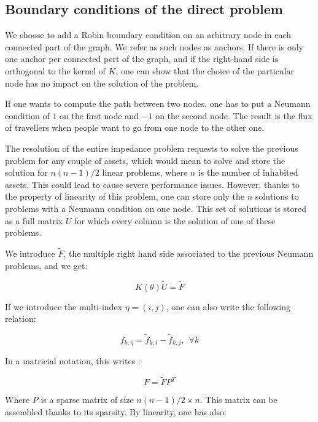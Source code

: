 \documentclass[11pt,a4paper]{article}		%
\begin{document}
\subsection{Boundary conditions of the direct problem}

We choose to add a Robin boundary condition on an arbitrary node in each connected part of the graph. We refer as such nodes as anchors. If there is only one anchor per connected pert of the graph, and if the right-hand side is orthogonal to the kernel of $K$, one can show that the choice of the particular node has no impact on the solution of the problem.

If one wants to compute the path between two nodes, one has to put a Neumann condition of $1$ on the first node and $-1$ on the second node. The result is the flux of travellers when people want to go from one node to the other one.

The resolution of the entire impedance problem requests to solve the previous problem for any couple of assets, which would mean to solve and store the solution for $n(n-1)/2$ linear problems, where $n$ is the number of inhabited assets. This could lead to cause severe performance issues. However, thanks to the property of linearity of this problem, one can store only the $n$ solutions to problems with a Neumann condition on one node. This set of solutions is stored as a full matrix $\tilde{U}$ for which every column is the solution of one of these problems.

We introduce $\tilde{F}$, the multiple right hand side associated to the previous Neumann problems, and we get:

\begin{equation}
K(\theta)\tilde{U} = \tilde{F}
\end{equation}

If we introduce the multi-index $\eta = (i,j)$, one can also write the following relation:

\begin{equation}
f_{k,\eta} = \tilde{f}_{k,i} - \tilde{f}_{k,j},\ \ \forall k
\end{equation}

In a matricial notation, this writes :

\begin{equation}
F = \tilde{F} P^T
\end{equation}

Where $P$ is a sparse matrix of size $n(n-1)/2\times n$. This matrix can be assembled thanks to its sparsity. By linearity, one has also:
\end{document}
